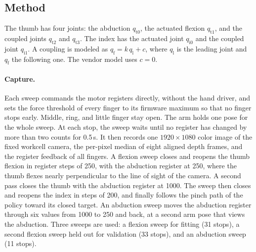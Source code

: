 \subsection{Method}

The thumb has four joints: the abduction $q_{\mathrm{t}0}$, the actuated flexion $q_{\mathrm{t}1}$, and the coupled joints $q_{\mathrm{t}2}$ and $q_{\mathrm{t}3}$. The index has the actuated joint $q_{\mathrm{i}0}$ and the coupled joint $q_{\mathrm{i}1}$. A coupling is modeled as $q_{\mathrm{f}}=k\,q_{\mathrm{l}}+c$, where $q_{\mathrm{l}}$ is the leading joint and $q_{\mathrm{f}}$ the following one. The vendor model uses $c=0$.

\paragraph{Capture.} Each sweep commands the motor registers directly, without the hand driver, and sets the force threshold of every finger to its firmware maximum so that no finger stops early. Middle, ring, and little finger stay open. The arm holds one pose for the whole sweep. At each stop, the sweep waits until no register has changed by more than two counts for 0.5\,s. It then records one $1920\times1080$ color image of the fixed workcell camera, the per-pixel median of eight aligned depth frames, and the register feedback of all fingers. A flexion sweep closes and reopens the thumb flexion in register steps of 250, with the abduction register at 250, where the thumb flexes nearly perpendicular to the line of sight of the camera. A second pass closes the thumb with the abduction register at 1000. The sweep then closes and reopens the index in steps of 200, and finally follows the pinch path of the policy toward its closed target. An abduction sweep moves the abduction register through six values from 1000 to 250 and back, at a second arm pose that views the abduction. Three sweeps are used: a flexion sweep for fitting (31 stops), a second flexion sweep held out for validation (33 stops), and an abduction sweep (11 stops).

